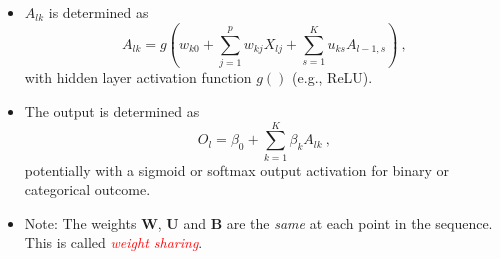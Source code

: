 \documentclass[
  10pt,
  ignorenonframetext,
  twocolumn]{beamer}
\providecommand{\tightlist}{%
  \setlength{\itemsep}{0pt}\setlength{\parskip}{0pt}}
\begin{document}
\begin{frame}
\begin{itemize}
\tightlist
\item
  \(A_{lk}\) is determined as \begin{equation}\label{eq:chain}
  A_{lk} = g(w_{k0} + \sum_{j=1}^p w_{kj}X_{lj} + \sum_{s=1}^K u_{ks}A_{l-1,s}) \ ,
  \end{equation} with hidden layer activation function \(g()\) (e.g.,
  ReLU).
\end{itemize}

\vspace{2mm}

\begin{itemize}
\tightlist
\item
  The output is determined as
  \[O_l = \beta_0 + \sum_{k=1}^K\beta_k A_{lk} \ ,\] potentially with a
  sigmoid or softmax output activation for binary or categorical
  outcome.
\end{itemize}

\vspace{2mm}

\begin{itemize}
\tightlist
\item
  Note: The weights \(\boldsymbol{W}\), \(\boldsymbol{U}\) and
  \(\boldsymbol{B}\) are the \emph{same} at each point in the sequence.
  This is called \emph{\textcolor{red}{weight sharing}}.
\end{itemize}
\end{frame}
\end{document}
